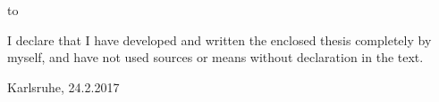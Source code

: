 \thispagestyle{empty}
\vspace*{40\baselineskip}
\hbox to \textwidth{\hrulefill}
\par
I declare that I have developed and written the enclosed thesis completely by myself, and
have not used sources or means without declaration in the text.

\vspace{2cm}

Karlsruhe, 24.2.2017



\clearpage






